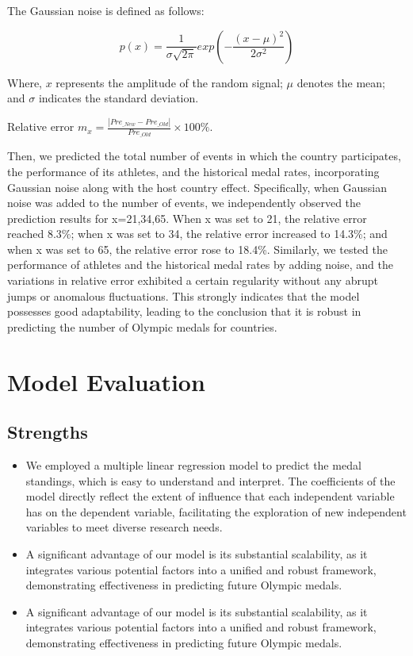 \documentclass{mcmthesis}
\begin{document}
The Gaussian noise is defined as follows:

\begin{equation}
p(x)=\frac{1}{\sigma \sqrt{2\pi}}exp(-\frac{(x-\mu)^{2}}{2\sigma ^{2}})
\end{equation}

Where, $x$ represents the amplitude of the random signal; $\mu$ denotes the mean; and $\sigma$ indicates the standard deviation.

Relative error $m_{x} = \frac{\left | Pre_{\_New} - Pre_{\_Old}\right |}{Pre_{\_Old}}\times 100\%$.

Then, we predicted the total number of events in which the country participates, the performance of its athletes, and the historical medal rates, incorporating Gaussian noise along with the host country effect. Specifically, when Gaussian noise was added to the number of events, we independently observed the prediction results for x=21,34,65. When x was set to 21, the relative error reached 8.3\%; when x was set to 34, the relative error increased to 14.3\%; and when x was set to 65, the relative error rose to 18.4\%. Similarly, we tested the performance of athletes and the historical medal rates by adding noise, and the variations in relative error exhibited a certain regularity without any abrupt jumps or anomalous fluctuations. This strongly indicates that the model possesses good adaptability, leading to the conclusion that it is robust in predicting the number of Olympic medals for countries.

\section{Model Evaluation}
\subsection{Strengths}
\begin{itemize}
\item We employed a multiple linear regression model to predict the medal standings, which is easy to understand and interpret. The coefficients of the model directly reflect the extent of influence that each independent variable has on the dependent variable, facilitating the exploration of new independent variables to meet diverse research needs.

\item A significant advantage of our model is its substantial scalability, as it integrates various potential factors into a unified and robust framework, demonstrating effectiveness in predicting future Olympic medals.

\item A significant advantage of our model is its substantial scalability, as it integrates various potential factors into a unified and robust framework, demonstrating effectiveness in predicting future Olympic medals.
\end{itemize}
\end{document}
